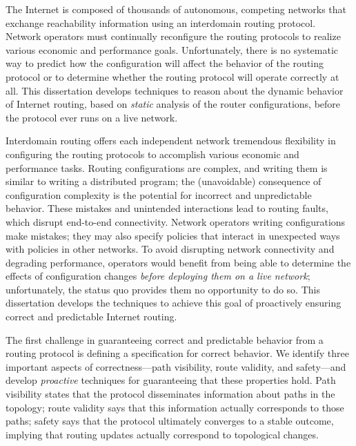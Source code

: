 The Internet is composed of thousands of autonomous,
competing networks that exchange reachability information using an
interdomain routing protocol.  Network operators must continually
reconfigure the routing protocols to realize various economic and
performance goals.  Unfortunately, there is no systematic way to predict
how the configuration will affect the behavior of the routing protocol
or to determine whether the routing protocol will operate correctly at
all.
This dissertation develops techniques to reason about
the dynamic behavior of Internet routing, based on {\em static}
analysis of the router configurations, before the protocol ever runs on
a live network.  

Interdomain routing offers each independent network tremendous
flexibility in configuring the routing protocols to accomplish various
economic and performance tasks.  Routing configurations are
complex, and writing them is similar to writing a distributed program;
the (unavoidable) consequence of configuration complexity is the
potential for incorrect and unpredictable behavior.  These mistakes and
unintended interactions lead to routing faults, which disrupt end-to-end
connectivity.  Network operators writing configurations make mistakes;
they may also specify policies that interact in unexpected ways with
policies in other networks.  To avoid disrupting network connectivity
and degrading performance, operators would benefit from being able to
determine the effects of 
configuration 
changes {\em before deploying them on a live network}; unfortunately,
the status quo provides them no opportunity to do so.  This dissertation
develops the techniques to achieve this goal of proactively ensuring
correct and predictable Internet routing.

The first challenge in guaranteeing correct and predictable behavior
from a routing protocol is defining a specification for correct behavior.
We identify three important aspects of correctness---path visibility,
route validity, and safety---and develop {\em proactive} techniques for
guaranteeing that these properties hold.  Path visibility states that
the protocol disseminates information about paths in the topology; route
validity says that this information actually corresponds to those paths;
safety says that the protocol ultimately converges to a stable outcome,
implying that routing updates actually correspond to topological changes.


